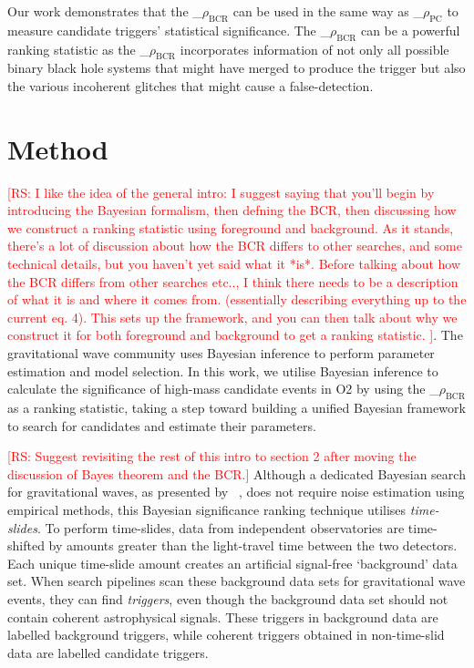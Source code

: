 \documentclass[%
 nofootinbib,
 amsmath,amssymb,
 aps,
 twocolumn
]{revtex4-2}
\newcommand{\mathcmd}[1]{{\sc \relax\ifmmode#1\else $#1$\fi}\xspace}
\newcommand{\bcr}{\mathcmd{\rho_\text{BCR}}}
\newcommand{\pycbcstat}{\mathcmd{\rho_\text{PC}}}
\newcommand{\rs}[1]{\textcolor{red}{[RS: #1]}}
\begin{document}
Our work demonstrates that the \bcr can be used in the same way as \pycbcstat to measure candidate triggers' statistical significance.  The \bcr can be a powerful ranking statistic as the \bcr incorporates information of not only all possible binary black hole systems that might have merged to produce the trigger but also the various incoherent glitches that might cause a false-detection. 


\section{Method\label{sec:method}}

\rs{I like the idea of the general intro: I suggest saying that you'll begin by introducing the Bayesian formalism, then defning the BCR, then discussing how we construct a ranking statistic using foreground and background. As it stands, there's a lot of discussion about how the BCR differs to other searches, and some technical details, but you haven't yet said what it *is*.
Before talking about how the BCR differs from other searches etc.., I think there needs to be a description of what it is and where it comes from. (essentially describing everything up to the current eq. 4). This sets up the framework, and you can then talk about why we construct it for both foreground and background to get a ranking statistic. }.
The gravitational wave community uses Bayesian inference to perform parameter estimation and model selection. In this work, we utilise Bayesian inference to calculate the significance of high-mass candidate events in O2 by using the \bcr as a ranking statistic, taking a step toward building a unified Bayesian framework to search for candidates and estimate their parameters.


\rs{Suggest revisiting the rest of this intro to section 2 after moving the discussion of Bayes theorem and the BCR.}
Although a dedicated Bayesian search for gravitational waves, as presented by ~\citet{BCR2}, does not require noise estimation using empirical methods, this Bayesian significance ranking technique utilises \textit{time-slides}. To perform time-slides, data from independent observatories are time-shifted by amounts greater than the light-travel time between the two detectors. Each unique time-slide amount creates an artificial signal-free `background' data set. When search pipelines scan these background data sets for gravitational wave events, they can find \textit{triggers}\footnotemark, even though the background data set should not contain coherent astrophysical signals. These triggers in background data are labelled background triggers, while coherent triggers obtained in non-time-slid data are labelled candidate triggers.
\end{document}
